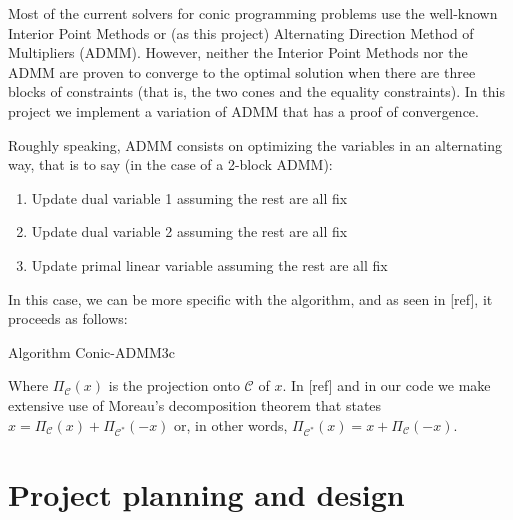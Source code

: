 \documentclass[paper=a4, fontsize=11pt]{scrartcl}
\numberwithin{equation}{section}		%
\numberwithin{figure}{section}			%
\numberwithin{table}{section}				%
\begin{document}
Most of the current solvers for conic programming problems use the well-known Interior Point Methods or (as this project) Alternating Direction Method of Multipliers (ADMM). However, neither the Interior Point Methods nor the ADMM are proven to converge to the optimal solution when there are three blocks of constraints (that is, the two cones and the equality constraints). In this project we implement a variation of ADMM that has a proof of convergence.

Roughly speaking, ADMM consists on optimizing the variables in an alternating way, that is to say (in the case of a 2-block ADMM):
\begin{enumerate}
\item Update dual variable 1 assuming the rest are all fix
\item Update dual variable 2 assuming the rest are all fix
\item Update primal linear variable assuming the rest are all fix
\end{enumerate}
 
In this case, we can be more specific with the algorithm, and as seen in [ref], it proceeds as follows:
\begin{algorithm}
	\caption{Algorithm Conic-ADMM3c}
\end{algorithm}

Where $\Pi_\mathcal{C}(x)$ is the projection onto $\mathcal{C}$ of $x$. In [ref] and in our code we make extensive use of Moreau's decomposition theorem that states $x = \Pi_{\mathcal{C}}(x)+ \Pi_{\mathcal{C}^*}(-x)$ or, in other words, $\Pi_{\mathcal{C}^*}(x) = x + \Pi_{\mathcal{C}}(-x)$.

\section{Project planning and design}
\end{document}
